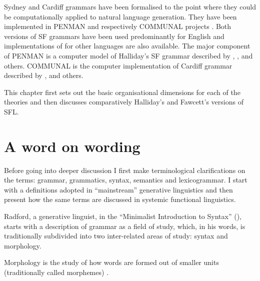 Sydney and Cardiff grammars have been formalised to the point where they could be computationally applied to natural language generation. They have been implemented in PENMAN \citep{PenmanOverview,Penman89} and respectively COMMUNAL projects \citep{Fawcett90-communal}. Both versions of SF grammars have been used predominantly for English and implementations of for other languages are also available. The major component of PENMAN is a computer model of Halliday's SF grammar described by \citet{gazebo}, \citet{MatthiessenBateman91}, \citep{Matthiessen-lexcartog-book} and others. COMMUNAL is the computer implementation of Cardiff grammar described by \citet{Fawcett:1988}, \citet{Fawcett93-ewnlg4} and others. 

This chapter first sets out the basic organisational dimensions for each of the theories and then discusses comparatively Halliday's \citep{Halliday2002} and Fawcett's \citep{Fawcett2000} versions of SFL.


\section{A word on wording}
\label{sec:wording}
Before going into deeper discussion I first make terminological clarifications on the terms: grammar, grammatics, syntax, semantics and lexicogrammar. I start with a definitions adopted in ``mainstream'' generative linguistics and then present how the same terms are discussed in systemic functional linguistics.

Radford, a generative linguist, in the ``Minimalist Introduction to Syntax'' (\citeyear{Radford1997}), starts with a description of grammar as a field of study, which, in his words, is traditionally subdivided into two inter-related areas of study: syntax and morphology. %

\begin{definition}\label{def:morphology-min}
Morphology is the study of how words are formed out of smaller units (traditionally called morphemes) \citep[1]{Radford1997}.
\end{definition}

